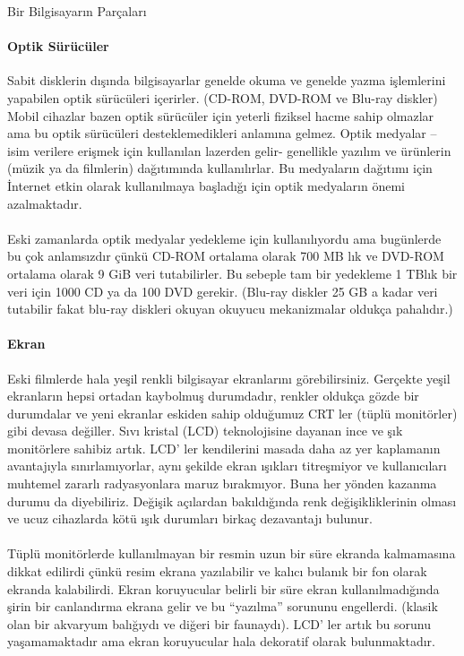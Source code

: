 \documentclass[10pt,a5paper]{book}
\begin{document}
\begin{section}{Bir Bilgisayarın Parçaları}
\paragraph{Optik Sürücüler}{Sabit disklerin dışında bilgisayarlar genelde okuma ve genelde yazma işlemlerini yapabilen optik sürücüleri içerirler. (CD-ROM, DVD-ROM ve Blu-ray diskler) Mobil cihazlar bazen optik sürücüler için yeterli fiziksel hacme sahip olmazlar ama bu optik sürücüleri desteklemedikleri anlamına gelmez. Optik medyalar – isim verilere erişmek için kullanılan lazerden gelir- genellikle yazılım ve ürünlerin (müzik ya da filmlerin) dağıtımında kullanılırlar. Bu medyaların dağıtımı için İnternet etkin olarak kullanılmaya başladığı için optik medyaların önemi azalmaktadır.}
\paragraph{}{Eski zamanlarda optik medyalar yedekleme için kullanılıyordu ama bugünlerde bu çok anlamsızdır çünkü CD-ROM ortalama olarak 700 MB lık ve DVD-ROM ortalama olarak 9 GiB veri tutabilirler. Bu sebeple tam bir yedekleme 1 TBlık bir veri için 1000 CD ya da 100 DVD gerekir. (Blu-ray diskler 25 GB a kadar veri tutabilir fakat blu-ray diskleri okuyan okuyucu mekanizmalar oldukça pahalıdır.)}
\paragraph{Ekran}{Eski filmlerde hala yeşil renkli bilgisayar ekranlarını görebilirsiniz. Gerçekte yeşil ekranların hepsi ortadan kaybolmuş durumdadır, renkler oldukça gözde bir durumdalar ve yeni ekranlar eskiden sahip olduğumuz CRT ler (tüplü monitörler) gibi devasa değiller. Sıvı kristal (LCD) teknolojisine dayanan ince ve şık monitörlere sahibiz artık. LCD' ler kendilerini masada daha az yer kaplamanın avantajıyla sınırlamıyorlar, aynı şekilde ekran ışıkları titreşmiyor ve kullanıcıları muhtemel zararlı radyasyonlara maruz bırakmıyor. Buna her yönden kazanma durumu da diyebiliriz.  Değişik açılardan bakıldığında renk değişikliklerinin olması ve ucuz cihazlarda kötü ışık durumları birkaç dezavantajı bulunur.}
\paragraph{}{Tüplü monitörlerde kullanılmayan bir resmin uzun bir süre ekranda kalmamasına dikkat edilirdi çünkü resim ekrana yazılabilir ve kalıcı bulanık bir fon olarak ekranda kalabilirdi. Ekran koruyucular belirli bir süre ekran kullanılmadığında şirin bir canlandırma ekrana gelir ve bu “yazılma” sorununu engellerdi. (klasik olan bir akvaryum balığıydı ve diğeri bir faunaydı). LCD' ler artık bu sorunu yaşamamaktadır ama ekran koruyucular hala dekoratif olarak bulunmaktadır.}

\end{section}
\end{document}
